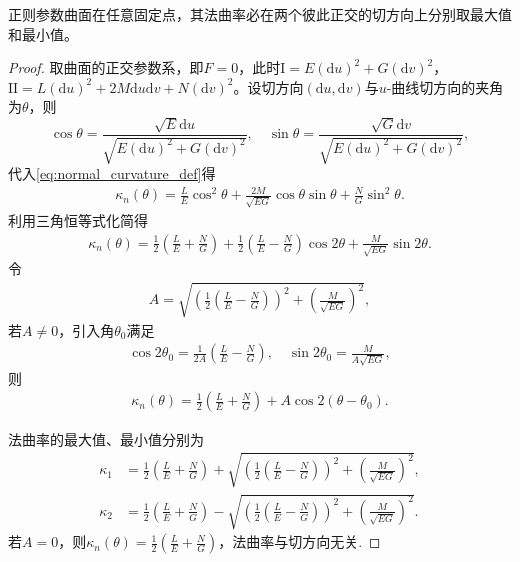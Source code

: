 \documentclass[../../main.tex]{subfiles}%
\begin{document}
\begin{theorem}
正则参数曲面在任意固定点，其法曲率必在两个彼此正交的切方向上分别取最大值和最小值。
\end{theorem}
\begin{proof}
取曲面的正交参数系，即$F=0$，此时$\mathrm{I}=E(\mathrm{d}u)^2+G(\mathrm{d}v)^2$，$\mathrm{II}=L(\mathrm{d}u)^2+2M\mathrm{d}u\mathrm{d}v+N(\mathrm{d}v)^2$。设切方向$(\mathrm{d}u,\mathrm{d}v)$与$u$-曲线切方向的夹角为$\theta$，则
$$\cos\theta=\frac{\sqrt{E}\mathrm{d}u}{\sqrt{E(\mathrm{d}u)^2+G(\mathrm{d}v)^2}},\quad \sin\theta=\frac{\sqrt{G}\mathrm{d}v}{\sqrt{E(\mathrm{d}u)^2+G(\mathrm{d}v)^2}},$$
代入\eqref{eq:normal_curvature_def}得
\begin{align*}
\kappa_n(\theta)=\frac{L}{E}\cos^2\theta+\frac{2M}{\sqrt{EG}}\cos\theta\sin\theta+\frac{N}{G}\sin^2\theta.
\end{align*}
利用三角恒等式化简得
\begin{align*}
\kappa_n(\theta)=\frac{1}{2}\left(\frac{L}{E}+\frac{N}{G}\right)+\frac{1}{2}\left(\frac{L}{E}-\frac{N}{G}\right)\cos2\theta+\frac{M}{\sqrt{EG}}\sin2\theta.
\end{align*}
令
\begin{align}
A=\sqrt{\left(\frac{1}{2}\left(\frac{L}{E}-\frac{N}{G}\right)\right)^2+\left(\frac{M}{\sqrt{EG}}\right)^2},\label{eq:A_def}
\end{align}
若$A\neq0$，引入角$\theta_0$满足
\begin{align}
\cos2\theta_0=\frac{1}{2A}\left(\frac{L}{E}-\frac{N}{G}\right),\quad \sin2\theta_0=\frac{M}{A\sqrt{EG}},\label{eq:theta0_def}
\end{align}
则
\begin{align*}
\kappa_n(\theta)=\frac{1}{2}\left(\frac{L}{E}+\frac{N}{G}\right)+A\cos2(\theta-\theta_0).
\end{align*}

法曲率的最大值、最小值分别为
\begin{align}
\kappa_1&=\frac{1}{2}\left(\frac{L}{E}+\frac{N}{G}\right)+\sqrt{\left(\frac{1}{2}\left(\frac{L}{E}-\frac{N}{G}\right)\right)^2+\left(\frac{M}{\sqrt{EG}}\right)^2},\label{eq:max_principal_curvature}\\
\kappa_2&=\frac{1}{2}\left(\frac{L}{E}+\frac{N}{G}\right)-\sqrt{\left(\frac{1}{2}\left(\frac{L}{E}-\frac{N}{G}\right)\right)^2+\left(\frac{M}{\sqrt{EG}}\right)^2}.\label{eq:min_principal_curvature}
\end{align}
若$A=0$，则$\kappa_n(\theta)=\frac{1}{2}\left(\frac{L}{E}+\frac{N}{G}\right)$，法曲率与切方向无关.
\end{proof}
\end{document}
